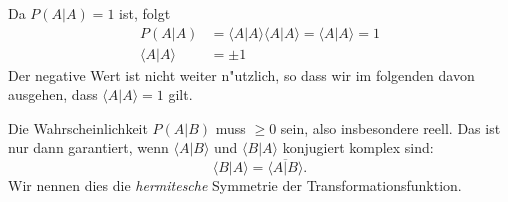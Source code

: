 Da $P(A|A) =1$ ist, folgt
\begin{align*}
P(A|A)&=\langle A|A\rangle \langle A|A\rangle = \langle A|A\rangle = 1
\\
\langle A|A\rangle&=\pm 1
\end{align*}
Der negative Wert ist nicht weiter n"utzlich, so dass wir im folgenden
davon ausgehen, dass $\langle A|A\rangle = 1$ gilt.

Die Wahrscheinlichkeit $P(A|B)$ muss $\ge 0$ sein, also insbesondere
reell. Das ist nur dann garantiert, wenn $\langle A|B\rangle$ und
$\langle B|A\rangle$ konjugiert komplex sind:
\begin{equation}
\langle B|A\rangle
=\overline{\langle A|B\rangle}.
\label{skript:hermiteschesymmetrie}
\end{equation}
Wir nennen dies die {\em hermitesche} Symmetrie der Transformationsfunktion.

